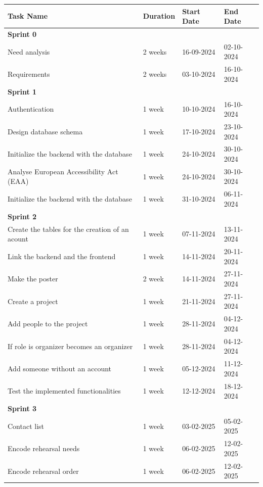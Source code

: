 \documentclass[11pt]{article}
\begin{document}
\begin{table}[htbp]
    \centering
    \begin{tabular}{| p{9cm} | p{2cm} | p{2.1cm} | p{2cm} |}
    \hline
    \textbf{Task Name} & \textbf{Duration} & \textbf{Start Date} & \textbf{End Date} \\
    \hline
    \textbf{Sprint 0} &&&\\
    \quad Need analysis & 2 weeks & 16-09-2024 & 02-10-2024 \\
    \quad Requirements & 2 weeks & 03-10-2024 & 16-10-2024 \\
    \textbf{Sprint 1} &&&\\
    \quad Authentication & 1 week & 10-10-2024 & 16-10-2024 \\
    \quad Design database schema & 1 week & 17-10-2024 & 23-10-2024 \\
    \quad Initialize the backend with the database & 1 week & 24-10-2024 & 30-10-2024 \\
    \quad Analyse European Accessibility Act (EAA) & 1 week & 24-10-2024 & 30-10-2024 \\
    \quad Initialize the backend with the database & 1 week & 31-10-2024 & 06-11-2024\\
    \textbf{Sprint 2} &&&\\
    \quad Create the tables for the creation of an acount & 1 week & 07-11-2024 & 13-11-2024 \\
    \quad Link the backend and the frontend & 1 week & 14-11-2024 & 20-11-2024 \\
    \quad Make the poster & 2 week & 14-11-2024 & 27-11-2024 \\
    \quad Create a project & 1 week & 21-11-2024 & 27-11-2024 \\
    \quad Add people to the project & 1 week & 28-11-2024 & 04-12-2024 \\
    \quad If role is organizer becomes an organizer & 1 week & 28-11-2024 & 04-12-2024 \\
    \quad Add someone without an account & 1 week & 05-12-2024 & 11-12-2024 \\
    \quad Test the implemented functionalities & 1 week & 12-12-2024 & 18-12-2024 \\
    \textbf{Sprint 3} &&&\\
    \quad Contact list & 1 week & 03-02-2025 & 05-02-2025 \\
    \quad Encode rehearsal needs & 1 week & 06-02-2025 & 12-02-2025\\
    \quad Encode rehearsal order & 1 week & 06-02-2025 & 12-02-2025\\

\end{tabular}
\end{table}
\end{document}
